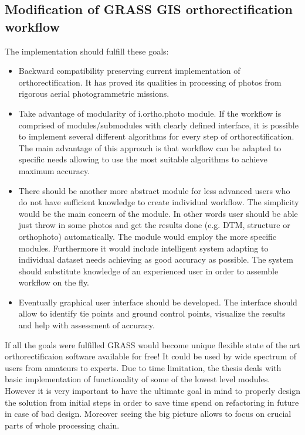 \documentclass[a4paper,12pt]{article}
\begin{document}
\subsection{Modification of GRASS GIS orthorectification workflow}

The implementation should fulfill these goals:

\begin{itemize}
\item Backward compatibility preserving current implementation of orthorectification.
It has proved its qualities in processing of photos from rigorous aerial photogrammetric missions.
\item Take advantage of modularity of i.ortho.photo module.
If the workflow is comprised of modules/submodules with clearly defined interface, it is possible to implement
several different algorithms for every step of orthorectification. The main advantage of this 
approach is that workflow can be adapted to specific needs allowing to use 
the most suitable algorithms to achieve maximum accuracy.
\item There should be another more abstract module for less advanced users who do not have sufficient knowledge to create individual 
workflow. The simplicity would be the main concern of the module. In other words user should be able just throw in   
 some photos and get the results done (e.g. DTM, structure or orthophoto) automatically. 
The module would employ the more specific modules. Furthermore it would include intelligent system adapting to individual 
dataset needs achieving as good accuracy as possible. 
The system should substitute knowledge of an experienced user in order to assemble workflow on the fly.
\item Eventually graphical user interface should be developed. The interface should 
allow to identify tie points and ground control points, visualize the results and help with assessment of accuracy.  
\end{itemize}

If all the goals were fulfilled GRASS would become unique flexible state of the art orthorectificaion 
software available for free! It could be used by wide spectrum of users from amateurs to experts.
Due to time limitation, the thesis deals with basic implementation of functionality of some of the lowest level modules. 
However it is very important to have 
the ultimate goal in mind to properly design the solution from initial steps in order to save time spend on refactoring in future
 in case of bad design. Moreover seeing the big picture allows to focus on crucial parts of whole processing chain.
\end{document}
